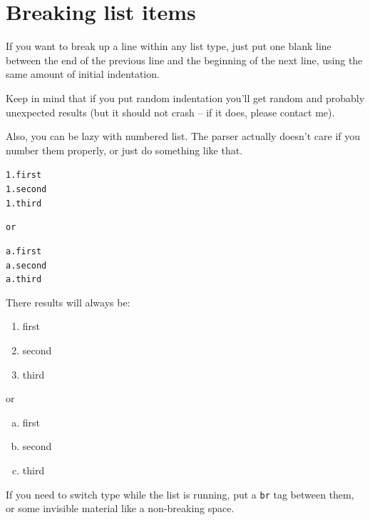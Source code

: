 \documentclass[DIV=12,%
               BCOR=0mm,%
               fontsize=10pt,%
               oneside,%
               paper=210mm:11in]{scrbook}
\begin{document}
\section{Breaking list items}


If you want to break up a line within any list type, just put one blank
line between the end of the previous line and the beginning of the next
line, using the same amount of initial indentation.


Keep in mind that if you put random indentation you'll get random and
probably unexpected results (but it should not crash -- if it does,
please contact me).


Also, you can be lazy with numbered list. The parser actually doesn't
care if you number them properly, or just do something like that.


\begin{alltt}
 1. first
 1. second
 1. third

or

 a. first
 a. second
 a. third

\end{alltt}


There results will always be:


\begin{enumerate}[1.]
\item\relax 
first



\item\relax 
second



\item\relax 
third




\end{enumerate}

or


\begin{enumerate}[a.]
\item\relax 
first



\item\relax 
second



\item\relax 
third




\end{enumerate}

If you need to switch type while the list is running, put a \texttt{br} tag
between them, or some invisible material like a non-breaking space.
\end{document}
